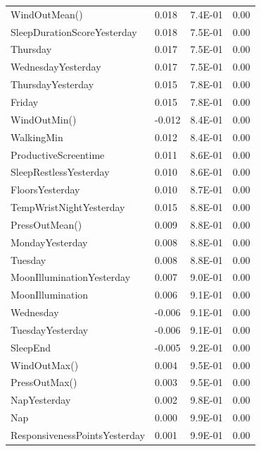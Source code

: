 \documentclass[conference]{IEEEtran}
\begin{document}
\begin{table}[]
\begin{tabular}{llll}
WindOutMean()                  & 0.018  & 7.4E-01          & 0.00           \\
SleepDurationScoreYesterday    & 0.018  & 7.5E-01          & 0.00           \\
Thursday                       & 0.017  & 7.5E-01          & 0.00           \\
WednesdayYesterday             & 0.017  & 7.5E-01          & 0.00           \\
ThursdayYesterday              & 0.015  & 7.8E-01          & 0.00           \\
Friday                         & 0.015  & 7.8E-01          & 0.00           \\
WindOutMin()                   & -0.012 & 8.4E-01          & 0.00           \\
WalkingMin                     & 0.012  & 8.4E-01          & 0.00           \\
ProductiveScreentime           & 0.011  & 8.6E-01          & 0.00           \\
SleepRestlessYesterday         & 0.010  & 8.6E-01          & 0.00           \\
FloorsYesterday                & 0.010  & 8.7E-01          & 0.00           \\
TempWristNightYesterday        & 0.015  & 8.8E-01          & 0.00           \\
PressOutMean()                 & 0.009  & 8.8E-01          & 0.00           \\
MondayYesterday                & 0.008  & 8.8E-01          & 0.00           \\
Tuesday                        & 0.008  & 8.8E-01          & 0.00           \\
MoonIlluminationYesterday      & 0.007  & 9.0E-01          & 0.00           \\
MoonIllumination               & 0.006  & 9.1E-01          & 0.00           \\
Wednesday                      & -0.006 & 9.1E-01          & 0.00           \\
TuesdayYesterday               & -0.006 & 9.1E-01          & 0.00           \\
SleepEnd                       & -0.005 & 9.2E-01          & 0.00           \\
WindOutMax()                   & 0.004  & 9.5E-01          & 0.00           \\
PressOutMax()                  & 0.003  & 9.5E-01          & 0.00           \\
NapYesterday                   & 0.002  & 9.8E-01          & 0.00           \\
Nap                            & 0.000  & 9.9E-01          & 0.00           \\
ResponsivenessPointsYesterday  & 0.001  & 9.9E-01          & 0.00          
\end{tabular}
\end{table}
\end{document}
